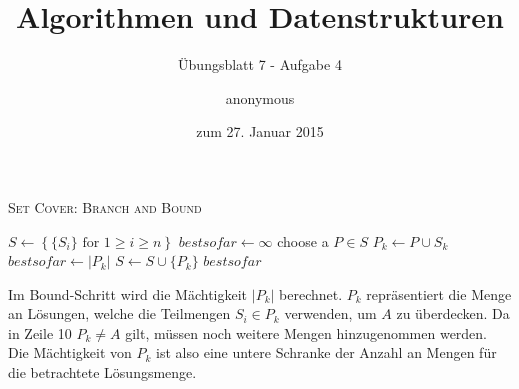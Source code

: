 \documentclass[a4paper]{scrartcl}
\title{Algorithmen und Datenstrukturen}
\subtitle{Übungsblatt 7 - Aufgabe 4}
\author{
    anonymous
}
\date{zum 27. Januar 2015}
\begin{document}
\maketitle

\begin{algorithm}
    \caption{\textsc{Set Cover: Branch and Bound}}
    \label{alg:bnb}
    \begin{algorithmic}[1]
        \State $S \gets \left\{ \{ S_i \} \text{ for } 1 \geq i \geq n \right\}$
        \State $bestsofar \gets \infty$
            \State choose a $P \in S$
                \State $P_k \gets P \cup S_k$
                    \State $bestsofar \gets |P_k|$
                \State $S \gets S \cup \{ P_k \}$
                \EndIf
            \EndFor
        \EndWhile
        \State \Return $bestsofar$
        \EndProcedure
    \end{algorithmic}
\end{algorithm}

Im Bound-Schritt wird die Mächtigkeit $|P_k|$ berechnet.
$P_k$ repräsentiert die Menge an Lösungen, welche die Teilmengen $S_i \in P_k$
verwenden, um $A$ zu überdecken.
Da in Zeile 10 $P_k \neq A$ gilt, müssen noch weitere Mengen hinzugenommen
werden.
Die Mächtigkeit von $P_k$ ist also eine untere Schranke der Anzahl an Mengen
für die betrachtete Lösungsmenge.
\end{document}
